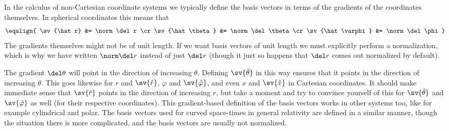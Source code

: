 

\def\ccr{\cr\noalign{\vskip3pt}}



In the calculus of non-Cartesian coordinate systems we typically define the
basis vectors in terms of the gradients of the coordinates themselves. In
spherical coordinates this means that
$$
\eqalign{
\sv{\hat r} &= \norm\del r \cr
\sv{\hat \theta} &= \norm\del \theta \cr
\sv{\hat \varphi} &= \norm\del \phi
}
$$
The gradients themselves might not be of unit length. If we want basis vectors
of unit length we must explicitly perform a normalization, which is why we
have written $\norm \del r$ instead of just $\del r$ (though it just so
happens that $\del r$ comes out normalized by default).

The gradient $\del\theta$ will point in the direction of increasing $\theta$.
Defining $\sv{\hat\theta}$ in this way ensures that it points in the direction
of increasing $\theta$. This goes likewise for $r$ and $\sv{\hat r}$,
$\varphi$ and $\sv{\hat\varphi}$, and even $x$ and $\sv{\hat x}$ in Cartesian
coordinates. It should make immediate sense that $\sv{\hat r}$ points in the
direction of increasing $r$, but take a moment and try to convince yourself of
this for $\sv{\hat\theta}$ and $\sv{\hat\varphi}$ as well (for their
respective coordinates). This gradient-based definition of the basis vectors
works in other systems too, like for example cylindrical and polar. The basis
vectors used for curved space-times in general relativity are defined in a
similar manner, though the situation there is more complicated, and the basis
vectors are usually not normalized.

